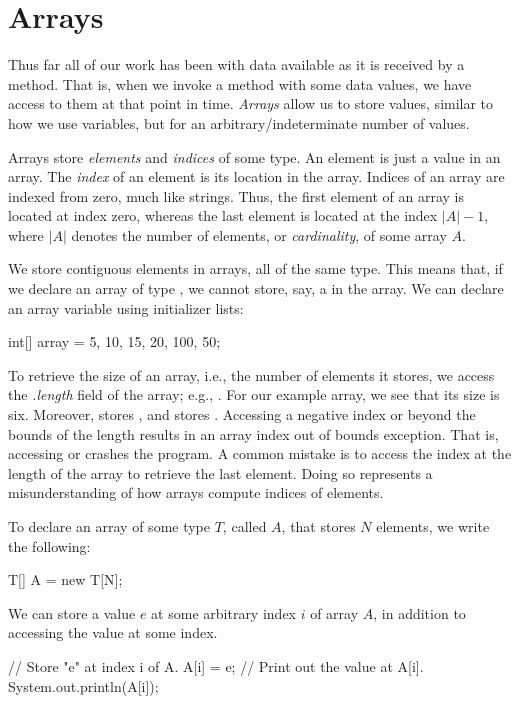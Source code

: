 \section{Arrays}

Thus far all of our work has been with data available as it is received by a method. That is, when we invoke a method with some data values, we have access to them at that point in time. \emph{Arrays} allow us to store values, similar to how we use variables, but for an arbitrary/indeterminate number of values.

Arrays store \emph{elements} and \emph{indices} of some type. An element is just a value in an array. The \emph{index} of an element is its location in the array. Indices of an array are indexed from zero, much like strings. Thus, the first element of an array is located at index zero, whereas the last element is located at the index $|A| - 1$, where $|A|$ denotes the number of elements, or \emph{cardinality}, of some array $A$.

We store contiguous elements in arrays, all of the same type. This means that, if we declare an array of type , we cannot store, say, a  in the array. We can declare an array variable using initializer lists:
\begin{verbnobox}[\small]
int[] array = {5, 10, 15, 20, 100, 50};
\end{verbnobox}
To retrieve the size of an array, i.e., the number of elements it stores, we access the \emph{.length} field of the array; e.g., . For our example array, we see that its size is six. Moreover,  stores , and  stores . Accessing a negative index or beyond the bounds of the length results in an array index out of bounds exception. That is, accessing  or  crashes the program. A common mistake is to access the index at the length of the array to retrieve the last element. Doing so represents a misunderstanding of how arrays compute indices of elements.

To declare an array of some type $T$, called $A$, that stores $N$ elements, we write the following:
\begin{verbnobox}[\small]
T[] A = new T[N];
\end{verbnobox}
We can store a value $e$ at some arbitrary index $i$ of array $A$, in addition to accessing the value at some index.
\begin{verbnobox}[\small]
// Store "e" at index i of A.
A[i] = e;
// Print out the value at A[i].
System.out.println(A[i]);
\end{verbnobox}

